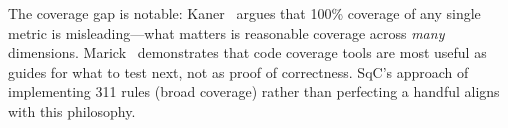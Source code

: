 The coverage gap is notable: Kaner~\cite{kaner} argues that 100\%
coverage of any single metric is misleading---what matters is
reasonable coverage across \emph{many} dimensions.
Marick~\cite{marick} demonstrates that code coverage tools are
most useful as guides for what to test next, not as proof of
correctness.  SqC's approach of implementing 311 rules (broad
coverage) rather than perfecting a handful aligns with this
philosophy.
